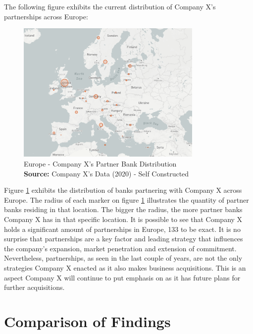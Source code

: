 \documentclass[11pt,a4paper]{article}
\newcommand*{\captionsource}[2]{%
  \caption[{#1}]{%
    #1%
    \\\hspace{\linewidth}%
    \textbf{Source:} #2%
  }%
}
\begin{document}
{{The following figure exhibits the current distribution of Company X's partnerships across Europe:

  \vspace{5mm}
\begin{figure}[H]
	\centering
  \includegraphics[width=90mm]{figures/fig_partner_dist}
  \vspace{5mm}
    \captionsetup{justification=centering,margin=2cm}
      \captionsource{Europe - Company X's Partner Bank Distribution}{Company X's Data (2020) - Self Constructed}
	\label{fig:raisin_partnerbank_dist}
\end{figure}

Figure \ref{fig:raisin_partnerbank_dist} exhibits the distribution of banks partnering with Company X across Europe. The radius of each marker on figure \ref{fig:raisin_partnerbank_dist} illustrates the quantity of partner banks residing in that location. The bigger the radius, the more partner banks Company X has in that specific location. It is possible to see that Company X holds a significant amount of partnerships in Europe, 133 to be exact. It is no surprise that partnerships are a key factor and leading strategy that influences the company's expansion, market penetration and extension of commitment. Nevertheless, partnerships, as seen in the last couple of years, are not the only strategies Company X enacted as it also makes business acquisitions. This is an aspect Company X will continue to put emphasis on as it has future plans for further acquisitions. 

\vspace{-1mm}

\section{Comparison of Findings}
\vspace{-2mm}
\label{findings_comparison}

}}
\end{document}
